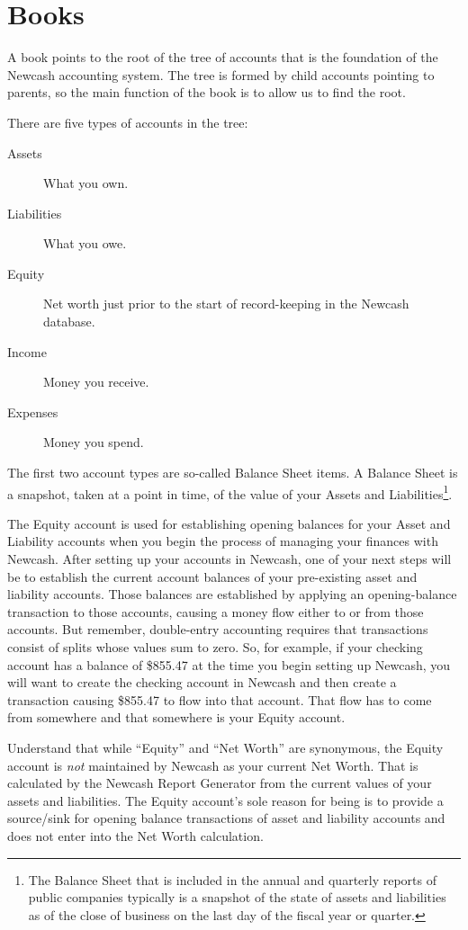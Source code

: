 \documentclass{report}
\begin{document}
\section{Books}
\label{Books}
A book points to the root of the tree of accounts that is the foundation of the Newcash accounting system. The tree is formed by child accounts pointing to parents, so the main function of the book is to allow us to find the root.

There are five types of accounts in the tree:
\begin{description}
\item [Assets] What you own.
\item [Liabilities] What you owe.
\item [Equity] Net worth just prior to the start of record-keeping in the Newcash database.
\item [Income] Money you receive.
\item [Expenses] Money you spend.
\end{description}

The first two account types are so-called Balance Sheet items. A Balance Sheet is a snapshot, taken at a point in time, of the value of your Assets and Liabilities\footnote{The Balance Sheet that is included in the annual and quarterly reports of public companies typically is a snapshot of the state of assets and liabilities as of the close of business on the last day of the fiscal year or quarter.}. 

The Equity account is used for establishing opening balances for your Asset and Liability accounts when you begin the process of managing your finances with Newcash. After setting up your accounts in Newcash, one of your next steps will be to establish the current account balances of your pre-existing asset and liability accounts. Those balances are established by applying an opening-balance transaction to those accounts, causing a money flow either to or from those accounts. But remember, double-entry accounting requires that transactions consist of splits whose values sum to zero. So, for example, if your checking account has a balance of \$855.47 at the time you begin setting up Newcash, you will want to create the checking account in Newcash and then create a transaction causing \$855.47 to flow into that account. That flow has to come from somewhere and that somewhere is your Equity account.

Understand that while ``Equity'' and ``Net Worth'' are synonymous, the Equity account is \emph{not} maintained by Newcash as your current Net Worth. That is calculated by the Newcash Report Generator from the current values of your assets and liabilities. The Equity account's sole reason for being is to provide a source/sink for opening balance transactions of asset and liability accounts and does not enter into the Net Worth calculation.
\end{document}
